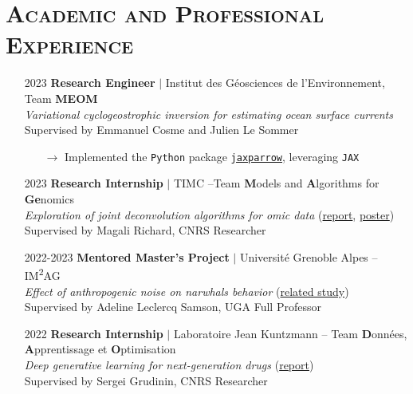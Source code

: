 \documentclass{article}
\begin{document}
\section*{\textsc{Academic and Professional Experience}}
\begin{itemize}
    \item[] 2023 \tabto{2cm} \textbf{Research Engineer} $\vert$ Institut des Géosciences de l'Environnement, Team \textbf{MEOM} \\[.1 cm]
    \tabto{2cm} \textit{Variational cyclogeostrophic inversion for estimating ocean surface currents} \\[.1 cm]
    \tabto{2cm} Supervised by Emmanuel Cosme and Julien Le Sommer
    \vspace{-.1 cm}
    \begin{itemize}[left=2cm]
        \item[$\rightarrow$] Implemented the \texttt{Python} package \href{https://github.com/meom-group/jaxparrow}{\texttt{jaxparrow}}, leveraging \texttt{JAX}
    \end{itemize}
    
    \item[] 2023 \tabto{2cm} \textbf{Research Internship} $\vert$ TIMC –Team \textbf{M}odels and \textbf{A}lgorithms for \textbf{Ge}nomics \\[.1 cm]
    \tabto{2cm} \textit{Exploration of joint deconvolution algorithms for omic data} (\href{https://vadmbertr.github.io/Exploration-of-joint-deconvolution-algorithms-for-omic-data/M2_Internship_report__Exploration_of_joint_deconvolution_algorithms_for_omic_data.pdf}{report}, \href{https://vadmbertr.github.io/Exploration-of-joint-deconvolution-algorithms-for-omic-data/poster_jobim_ismb.pdf}{poster}) \\[.1 cm]
    \tabto{2cm} Supervised by Magali Richard, CNRS Researcher
    
    \item[] 2022-2023 \tabto{2cm} \textbf{Mentored Master's Project} $\vert$ Université Grenoble Alpes – IM\textsuperscript{2}AG \\[.1 cm]
    \tabto{2cm} \textit{Effect of anthropogenic noise on narwhals behavior} (\href{https://doi.org/10.1126/sciadv.ade0440}{related study}) \\[.1 cm]
    \tabto{2cm} Supervised by Adeline Leclercq Samson, UGA Full Professor
    
    \item[] 2022 \tabto{2cm} \textbf{Research Internship} $\vert$ Laboratoire Jean Kuntzmann – Team \textbf{D}onnées, \textbf{A}pprentissage et \textbf{O}ptimisation \\[.1 cm]
    \tabto{2cm} \textit{Deep generative learning for next-generation drugs} (\href{https://vadmbertr.github.io/Deep-generative-learning-for-next-generation-drugs/Internship_report___Deep_generative_learning_for_next_generation_drugs.pdf}{report}) \\[.1 cm]
    \tabto{2cm} Supervised by Sergei Grudinin, CNRS Researcher
    

\end{itemize}
\end{document}
